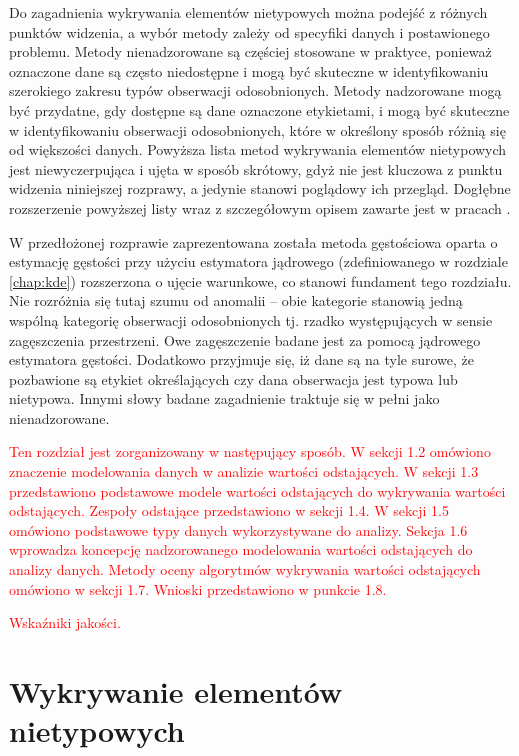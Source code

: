 \documentclass[12pt,a4paper,oneside]{book}
\theoremstyle{definition}
\begin{document}
Do zagadnienia wykrywania elementów nietypowych można podejść z różnych punktów widzenia, a wybór metody zależy od specyfiki danych i postawionego problemu. Metody nienadzorowane są częściej stosowane w praktyce, ponieważ oznaczone dane są często niedostępne i mogą być skuteczne w identyfikowaniu szerokiego zakresu typów obserwacji odosobnionych. Metody nadzorowane mogą być przydatne, gdy dostępne są dane oznaczone etykietami, i mogą być skuteczne w identyfikowaniu obserwacji odosobnionych, które w określony sposób różnią się od większości danych. Powyższa lista metod wykrywania elementów nietypowych jest niewyczerpująca i ujęta w sposób skrótowy, gdyż nie jest kluczowa z punktu widzenia niniejszej rozprawy, a jedynie stanowi poglądowy ich przegląd. Dogłębne rozszerzenie powyższej listy wraz z szczegółowym opisem zawarte jest w pracach \cite{Aggarwal_2017, Hawkins_1980, Hodge_2004, Rousseeuw_2011}.

W przedłożonej rozprawie zaprezentowana została metoda gęstościowa oparta o estymację gęstości przy użyciu estymatora jądrowego (zdefiniowanego w rozdziale \ref{chap:kde}) rozszerzona o ujęcie warunkowe, co stanowi fundament tego rozdziału. Nie rozróżnia się tutaj szumu od anomalii -- obie kategorie stanowią jedną wspólną kategorię obserwacji odosobnionych tj. rzadko występujących w sensie zagęszczenia przestrzeni. Owe zagęszczenie badane jest za pomocą jądrowego estymatora gęstości. Dodatkowo przyjmuje się, iż dane są na tyle surowe, że pozbawione są etykiet określających czy dana obserwacja jest typowa lub nietypowa. Innymi słowy badane zagadnienie traktuje się w pełni jako nienadzorowane.

\textcolor{red}{Ten rozdział jest zorganizowany w następujący sposób. W sekcji 1.2 omówiono znaczenie modelowania danych w analizie wartości odstających. W sekcji 1.3 przedstawiono podstawowe modele wartości odstających do wykrywania wartości odstających. Zespoły odstające przedstawiono w sekcji 1.4. W sekcji 1.5 omówiono podstawowe typy danych wykorzystywane do analizy. Sekcja 1.6 wprowadza koncepcję nadzorowanego modelowania wartości odstających do analizy danych. Metody oceny algorytmów wykrywania wartości odstających omówiono w sekcji 1.7. Wnioski przedstawiono w punkcie 1.8.}

\noindent \textcolor{red}{Wskaźniki jakości.}

\chapter{Wykrywanie elementów nietypowych}
\end{document}
